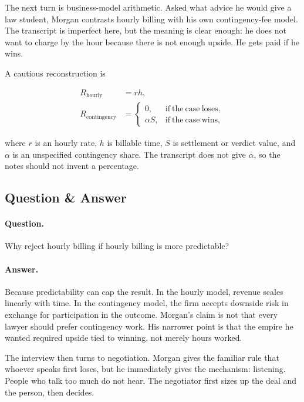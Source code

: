 The next turn is business-model arithmetic. Asked what advice he would give a law student, Morgan contrasts hourly billing with his own contingency-fee model. The transcript is imperfect here, but the meaning is clear enough: he does not want to charge by the hour because there is not enough upside. He gets paid if he wins.

A cautious reconstruction is

\begin{align}
R_{\mathrm{hourly}} &= r h,\\
R_{\mathrm{contingency}} &=
\begin{cases}
0, & \mathrm{if\ the\ case\ loses},\\
\alpha S, & \mathrm{if\ the\ case\ wins},
\end{cases}
\end{align}

where \(r\) is an hourly rate, \(h\) is billable time, \(S\) is settlement or verdict value, and \(\alpha\) is an unspecified contingency share. The transcript does not give \(\alpha\), so the notes should not invent a percentage.

\subsection{Question \& Answer}

\paragraph{Question.}
Why reject hourly billing if hourly billing is more predictable?

\paragraph{Answer.}
Because predictability can cap the result. In the hourly model, revenue scales linearly with time. In the contingency model, the firm accepts downside risk in exchange for participation in the outcome. Morgan's claim is not that every lawyer should prefer contingency work. His narrower point is that the empire he wanted required upside tied to winning, not merely hours worked.

The interview then turns to negotiation. Morgan gives the familiar rule that whoever speaks first loses, but he immediately gives the mechanism: listening. People who talk too much do not hear. The negotiator first sizes up the deal and the person, then decides.


